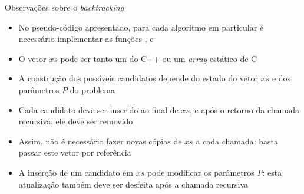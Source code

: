 \begin{frame}[fragile]{Observações sobre o {\it backtracking}}

    \begin{itemize}
        \item No pseudo-código apresentado, para cada algoritmo em particular é necessário
            implementar as funções ,  e

        \item O vetor $xs$ pode ser tanto um  do C++ ou um \textit{array} 
            estático de C

        \item A construção dos possíveis candidatos depende do estado do vetor $xs$ e dos
            parâmetros $P$ do problema

        \item Cada candidato deve ser inserido ao final de $xs$, e após o retorno da chamada
            recursiva, ele deve ser removido

        \item Assim, não é necessário fazer novas cópias de $xs$ a cada chamada: basta passar este
            vetor por referência

        \item A inserção de um candidato em $xs$ pode modificar os parâmetros $P$: esta
            atualização também deve ser desfeita após a chamada recursiva
    \end{itemize}

\end{frame}
